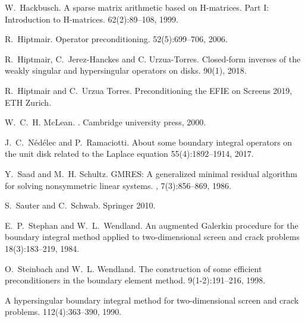 \documentclass[]{article}
\begin{document}
\begin{scriptsize}
\begin{thebibliography}{0}
		W.~Hackbusch.
		\newblock A sparse matrix arithmetic based on H-matrices. Part I: Introduction to H-matrices.
		 62(2):89--108, 1999.
		
		R.~Hiptmair.
		\newblock Operator preconditioning.
		 52(5):699--706, 2006.
		
		R.~Hiptmair, C.~Jerez-Hanckes and C. Urzua-Torres.
		\newblock Closed-form inverses of the weakly singular and hypersingular operators on disks.
		 90(1), 2018.
		
		
		R.~Hiptmair and C.~Urzua Torres.
		Preconditioning the EFIE on Screens
		 2019, ETH Zurich.
		
		W.~C.~H. McLean.
		.
		\newblock Cambridge university press, 2000.
		
		J.~C.~Nédélec and P.~Ramaciotti.
		\newblock About some boundary integral operators on the unit disk related to the Laplace equation
		 55(4):1892--1914, 2017.
		
		
		Y.~Saad and M.~H. Schultz.
		\newblock GMRES: A generalized minimal residual algorithm for solving
		nonsymmetric linear systems.
		,
		7(3):856--869, 1986.
		
		S.~Sauter and C.~Schwab.
		\newblock Springer 2010.
		
		E.~P.~Stephan and W.~L.~Wendland.
		\newblock An augmented Galerkin procedure for the boundary integral method applied to two-dimensional screen and crack problems
		 18(3):183--219, 1984.
		
		
		
		
		O.~Steinbach and W.~L. Wendland.
		\newblock The construction of some efficient preconditioners in the boundary
		element method.
		 9(1-2):191--216, 1998.
		
		\newblock A hypersingular boundary integral method for two-dimensional screen and crack problems.
		 112(4):363--390, 1990.
	\end{thebibliography}
\end{scriptsize}
\end{document}
